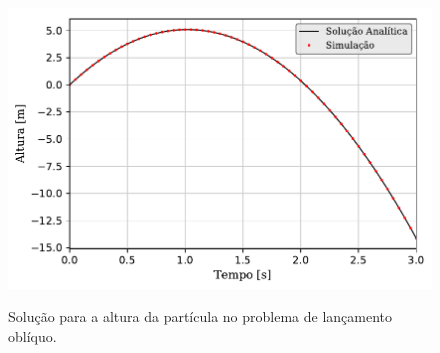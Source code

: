 \begin{figure}[htb!]
	\caption{Solução para a altura da partícula no problema de lançamento oblíquo\protect\footnotemark.}
	\centering
		\includegraphics[scale=1]{images/falling_sphere/correct_initial_acceleration/y_position.pdf}
	\label{fig:falling_sphere_y_position}
	\sourceMe
\end{figure}


